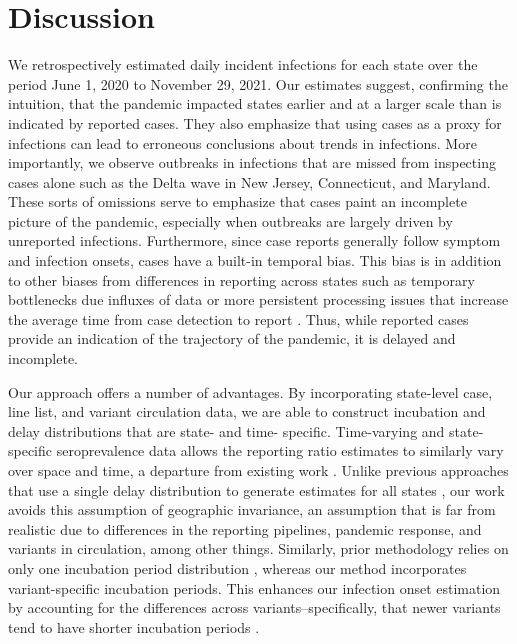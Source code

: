 \section{Discussion}

We retrospectively estimated daily incident infections for each \US state over
the period June 1, 2020 to November 29, 2021. Our estimates suggest, confirming
the intuition, that the pandemic impacted states earlier and at a larger scale
than is indicated by reported cases. They also emphasize that using cases as a
proxy for infections can lead to erroneous conclusions about trends in infections.
More importantly, we observe outbreaks in infections that are missed from
inspecting cases alone such as the Delta wave in 
New Jersey, Connecticut, and Maryland.
These sorts of omissions serve to emphasize that cases paint an incomplete
picture of the pandemic, especially when outbreaks are largely driven by
unreported infections. Furthermore, since case reports generally follow symptom
and infection onsets, cases have a built-in temporal bias. This bias is in addition
to other biases from differences in reporting across states such as temporary
bottlenecks due influxes of data or more persistent processing issues that
increase the average time from case detection to report \citep{wash2020dash,
dunkel2020covid19}. Thus, while reported cases provide an indication of the
trajectory of the pandemic, it is delayed and incomplete.

Our approach offers a number of advantages. By incorporating state-level case,
line list, and variant circulation data, we are able to construct incubation and
delay distributions that are state- and time- specific. Time-varying and
state-specific seroprevalence data allows the reporting ratio estimates to
similarly vary over space and time, a departure from existing work
\citep{unwin2020state, uga2020covid19}. Unlike previous approaches that use a
single delay distribution to generate estimates for all states
\citep{chitwood2022reconstructing, jahja2022real, miller2022statistical}, our work avoids this
assumption of geographic invariance, an assumption that is far from realistic
due to differences in the reporting pipelines, pandemic response, and variants in
circulation, among other things. Similarly, prior methodology relies on only one incubation
period distribution \citep{miller2022statistical}, 
whereas our method incorporates variant-specific incubation periods.
This enhances our infection onset estimation by accounting for
the differences across variants--specifically, 
that newer variants tend to have shorter incubation periods
\citep{tanaka2022shorter, ogata2022shorter, wu2022incubation}.


